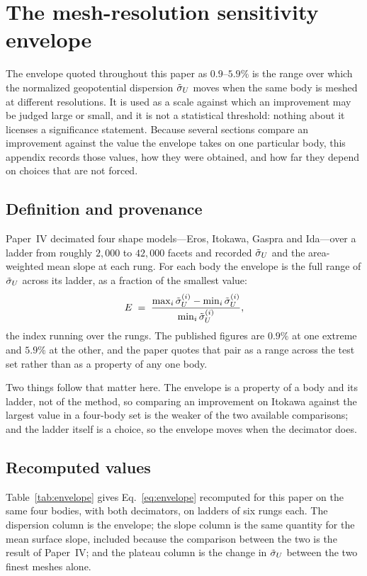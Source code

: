 \section{The mesh-resolution sensitivity envelope}
\label{app:envelope}

The envelope quoted throughout this paper as $0.9$--$5.9\%$ is the range over
which the normalized geopotential dispersion $\tilde{\sigma}_{U}$ moves when the same
body is meshed at different resolutions. It is used as a scale against which
an improvement may be judged large or small, and it is not a statistical
threshold: nothing about it licenses a significance statement. Because
several sections compare an improvement against the value the envelope takes
on one particular body, this appendix records those values, how they were
obtained, and how far they depend on choices that are not forced.

\subsection{Definition and provenance}
\label{app:envelope:def}

Paper~IV decimated four shape models---Eros, Itokawa, Gaspra and Ida---over a
ladder from roughly $2{,}000$ to $42{,}000$ facets and recorded $\tilde{\sigma}_{U}$ and
the area-weighted mean slope at each rung. For each body the envelope is the
full range of $\tilde{\sigma}_{U}$ across its ladder, as a fraction of the smallest
value:
\begin{equation}
E \;=\; \frac{\max_i \tilde{\sigma}_{U}^{(i)} - \min_i \tilde{\sigma}_{U}^{(i)}}
             {\min_i \tilde{\sigma}_{U}^{(i)}} ,
\label{eq:envelope}
\end{equation}
the index running over the rungs. The published figures are $0.9\%$ at one
extreme and $5.9\%$ at the other, and the paper quotes that pair as a range
across the test set rather than as a property of any one body.

Two things follow that matter here. The envelope is a property of a body and
its ladder, not of the method, so comparing an improvement on Itokawa against
the largest value in a four-body set is the weaker of the two available
comparisons; and the ladder itself is a choice, so the envelope moves when the
decimator does.

\subsection{Recomputed values}
\label{app:envelope:values}

Table~\ref{tab:envelope} gives Eq.~\eqref{eq:envelope} recomputed for this
paper on the same four bodies, with both decimators, on ladders of six rungs
each. The dispersion column is the envelope; the slope column is the same
quantity for the mean surface slope, included because the comparison between
the two is the result of Paper~IV; and the plateau column is the change in
$\tilde{\sigma}_{U}$ between the two finest meshes alone.

